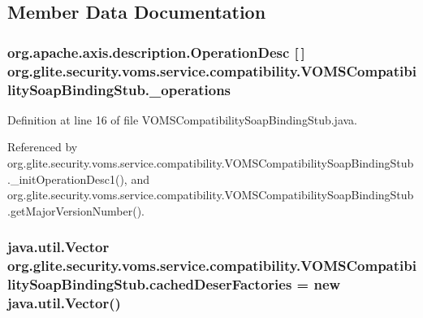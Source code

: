 \subsection{Member Data Documentation}
\hypertarget{classorg_1_1glite_1_1security_1_1voms_1_1service_1_1compatibility_1_1VOMSCompatibilitySoapBindingStub_a8d83a449a8e30b50cead97a91ea37fa7}{
\subsubsection[{\_\-operations}]{\setlength{\rightskip}{0pt plus 5cm}org.apache.axis.description.OperationDesc \mbox{[}$\,$\mbox{]} {\bf org.glite.security.voms.service.compatibility.VOMSCompatibilitySoapBindingStub.\_\-operations}}}
\label{classorg_1_1glite_1_1security_1_1voms_1_1service_1_1compatibility_1_1VOMSCompatibilitySoapBindingStub_a8d83a449a8e30b50cead97a91ea37fa7}


Definition at line 16 of file VOMSCompatibilitySoapBindingStub.java.



Referenced by org.glite.security.voms.service.compatibility.VOMSCompatibilitySoapBindingStub.\_\-initOperationDesc1(), and org.glite.security.voms.service.compatibility.VOMSCompatibilitySoapBindingStub.getMajorVersionNumber().

\hypertarget{classorg_1_1glite_1_1security_1_1voms_1_1service_1_1compatibility_1_1VOMSCompatibilitySoapBindingStub_a12107d852a0450f7d2b68a3c31b69519}{
\subsubsection[{cachedDeserFactories}]{\setlength{\rightskip}{0pt plus 5cm}java.util.Vector {\bf org.glite.security.voms.service.compatibility.VOMSCompatibilitySoapBindingStub.cachedDeserFactories} = new java.util.Vector()}}
\label{classorg_1_1glite_1_1security_1_1voms_1_1service_1_1compatibility_1_1VOMSCompatibilitySoapBindingStub_a12107d852a0450f7d2b68a3c31b69519}


